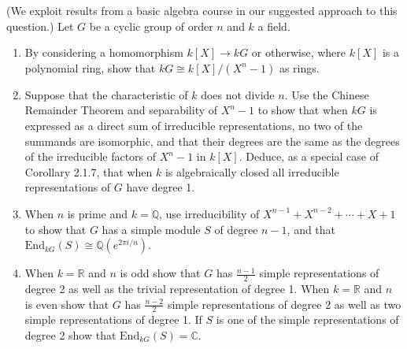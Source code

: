 \documentclass[openany]{book}
\begin{document}
\begin{prob}
(We exploit results from a basic algebra course in our suggested approach to this question.) Let \( G \) be a cyclic group of order \( n \) and \( k \) a field.

\begin{enumerate}[label=(\alph*)]
    \item By considering a homomorphism \( k[X] \to kG \) or otherwise, where \( k[X] \) is a polynomial ring, show that \( kG \cong k[X]/(X^n - 1) \) as rings.
    \item Suppose that the characteristic of \( k \) does not divide \( n \). Use the Chinese Remainder Theorem and separability of \( X^n - 1 \) to show that when \( kG \) is expressed as a direct sum of irreducible representations, no two of the summands are isomorphic, and that their degrees are the same as the degrees of the irreducible factors of \( X^n - 1 \) in \( k[X] \). Deduce, as a special case of Corollary 2.1.7, that when \( k \) is algebraically closed all irreducible representations of \( G \) have degree 1.
    \item When \( n \) is prime and \( k = \mathbb{Q} \), use irreducibility of \( X^{n-1} + X^{n-2} + \cdots + X + 1 \) to show that \( G \) has a simple module \( S \) of degree \( n - 1 \), and that \( \mathrm{End}_{kG}(S) \cong \mathbb{Q}(e^{2\pi i/n}) \).
    \item When \( k = \mathbb{R} \) and \( n \) is odd show that \( G \) has \( \frac{n-1}{2} \) simple representations of degree 2 as well as the trivial representation of degree 1. When \( k = \mathbb{R} \) and \( n \) is even show that \( G \) has \( \frac{n-2}{2} \) simple representations of degree 2 as well as two simple representations of degree 1. If \( S \) is one of the simple representations of degree 2 show that \( \mathrm{End}_{kG}(S) = \mathbb{C} \).
\end{enumerate}
\end{prob}
\end{document}
